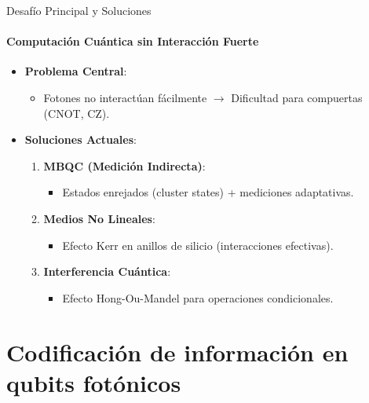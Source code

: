 \documentclass{beamer}
\begin{document}
\begin{frame}{Desafío Principal y Soluciones}
\framesubtitle{Computación Cuántica sin Interacción Fuerte}

\begin{itemize}
    \item \textbf{Problema Central}:
    \begin{itemize}
        \item Fotones no interactúan fácilmente $\rightarrow$ Dificultad para compuertas (CNOT, CZ).
    \end{itemize}
    
    \item \textbf{Soluciones Actuales}:
    \begin{enumerate}
        \item \textbf{MBQC (Medición Indirecta)}:
        \begin{itemize}
            \item Estados enrejados (cluster states) + mediciones adaptativas.
        \end{itemize}
        
        \item \textbf{Medios No Lineales}:
        \begin{itemize}
            \item Efecto Kerr en anillos de silicio (interacciones efectivas).
        \end{itemize}
        
        \item \textbf{Interferencia Cuántica}:
        \begin{itemize}
            \item Efecto Hong-Ou-Mandel para operaciones condicionales.
        \end{itemize}
    \end{enumerate}
\end{itemize}
\end{frame}

\section{Codificación de información en qubits fotónicos}
\end{document}
